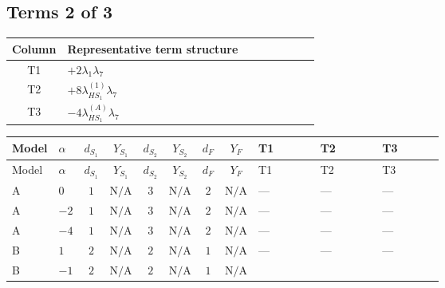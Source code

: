 \documentclass[8pt]{article}
\begin{document}
\begin{landscape}
\subsection*{Terms 2 of 3}
\begin{center}
\begin{tabular}{@{}c >{\raggedright\arraybackslash}p{0.82\linewidth}@{}}
\toprule
Column & Representative term structure \\
\midrule
T1 & \(\displaystyle +2 {\lambda_1} {\lambda_{7}}\) \\
\midrule
T2 & \(\displaystyle +8 {\lambda_{HS_1}^{(1)}} {\lambda_{7}}\) \\
\midrule
T3 & \(\displaystyle -4 {\lambda_{HS_1}^{(A)}} {\lambda_{7}}\) \\
\midrule
\bottomrule
\end{tabular}
\end{center}
\smallskip
\tiny
\begin{longtable}{@{}llcccccc >{\raggedright\arraybackslash}p{0.21\linewidth} >{\raggedright\arraybackslash}p{0.21\linewidth} >{\raggedright\arraybackslash}p{0.21\linewidth}@{}}
\toprule
Model & $\alpha$ & $d_{S_1}$ & $Y_{S_1}$ & $d_{S_2}$ & $Y_{S_2}$ & $d_F$ & $Y_F$ & T1 & T2 & T3 \\
\midrule
\endfirsthead
\toprule
Model & $\alpha$ & $d_{S_1}$ & $Y_{S_1}$ & $d_{S_2}$ & $Y_{S_2}$ & $d_F$ & $Y_F$ & T1 & T2 & T3 \\
\midrule
\endhead
A & $0$ & $1$ & $\text{N/A}$ & $3$ & $\text{N/A}$ & $2$ & $\text{N/A}$ & --- & --- & --- \\
\midrule
A & $-2$ & $1$ & $\text{N/A}$ & $3$ & $\text{N/A}$ & $2$ & $\text{N/A}$ & --- & --- & --- \\
\midrule
A & $-4$ & $1$ & $\text{N/A}$ & $3$ & $\text{N/A}$ & $2$ & $\text{N/A}$ & --- & --- & --- \\
\midrule
B & $1$ & $2$ & $\text{N/A}$ & $2$ & $\text{N/A}$ & $1$ & $\text{N/A}$ & --- & --- & --- \\
\midrule
B & $-1$ & $2$ & $\text{N/A}$ & $2$ & $\text{N/A}$ & $1$ & $\text{N/A}$ & \scriptsize\adjustbox{max width=\linewidth}{$\begin{gathered} +2 {\lambda_1} {\lambda_{7}}\end{gathered}$} & \scriptsize\adjustbox{max width=\linewidth}{$\begin{gathered} +8 {\lambda_{HS_1}^{(1)}} {\lambda_{7}}\end{gathered}$} & \scriptsize\adjustbox{max width=\linewidth}{$\begin{gathered} -4 {\lambda_{HS_1}^{(A)}} {\lambda_{7}}\end{gathered}$} \\

\end{longtable}
\end{landscape}
\end{document}
